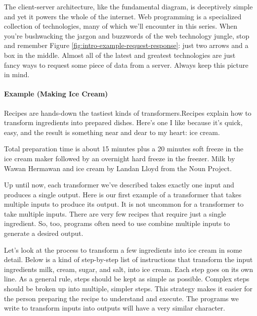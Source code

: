 The client-server architecture, like the fundamental diagram, is deceptively
simple and yet it powers the whole of the internet. Web programming is a specialized collection of
technologies, many of which we'll encounter in this series. When you're
bushwacking the jargon and buzzwords of the web technology jungle, stop and
remember Figure \ref{fig:intro-example-request-response}: just two arrows and a
box in the middle. Almost all of the latest and greatest technologies are just
fancy ways to request some piece of data from a server. Always keep this picture
in mind.

\paragraph{Example (Making Ice Cream)} Recipes are hands-down the tastiest kinds
of transformers.Recipes explain how to transform ingredients into prepared
dishes. Here's one I like because it's quick, easy, and the result is something
near and dear to my heart: ice cream.

\begin{marginfigure}
  
\caption{\label{fig:intro-example-ice-cream} Total preparation time is about 15
minutes plus a 20 minutes soft freeze in the ice cream maker followed by an
overnight hard freeze in the freezer.\vskip 5pt Milk by Wawan Hermawan and ice
cream by Landan Lloyd from the Noun Project.}
\end{marginfigure}

Up until now, each transformer we've described takes exactly one input and
produces a single output. Here is our first example of a transformer that takes
multiple inputs to produce its output. It is not uncommon for a transformer to
take multiple inputs. There are very few recipes that require just a single
ingredient. So, too, programs often need to use combine multiple inputs to
generate a desired output.

Let's look at the process to transform a few ingredients into ice cream in some
detail. Below is a kind of step-by-step list of instructions that transform the
input ingredients milk, cream, sugar, and salt, into ice cream. Each step goes
on its own line. As a general rule, steps should be kept as simple as possible.
Complex steps should be broken up into multiple, simpler steps. This strategy
makes it easier for the person preparing the recipe to understand and execute.
The programs we write to transform inputs into outputs will have a very similar
character.

